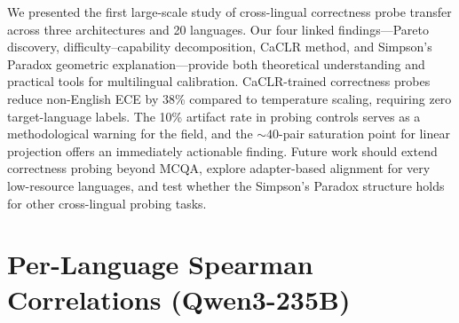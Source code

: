 \documentclass[11pt,a4paper]{article}
\newcommand{\caclr}{CaCLR}
\begin{document}
We presented the first large-scale study of cross-lingual correctness probe transfer across three architectures and 20 languages.
Our four linked findings---Pareto discovery, difficulty--capability decomposition, \caclr{} method, and Simpson's Paradox geometric explanation---provide both theoretical understanding and practical tools for multilingual calibration.
\caclr{}-trained correctness probes reduce non-English ECE by 38\% compared to temperature scaling, requiring zero target-language labels.
The 10\% artifact rate in probing controls serves as a methodological warning for the field, and the ${\sim}40$-pair saturation point for linear projection offers an immediately actionable finding.
Future work should extend correctness probing beyond MCQA, explore adapter-based alignment for very low-resource languages, and test whether the Simpson's Paradox structure holds for other cross-lingual probing tasks.





\appendix

\section{Per-Language Spearman Correlations (Qwen3-235B)}
\label{app:spearman}
\end{document}
